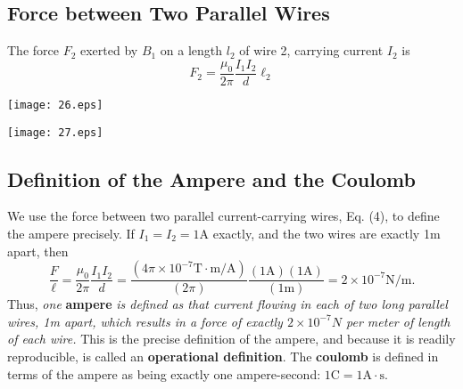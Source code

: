 \documentclass{elegantpaper}
\begin{document}
\begin{multicols}{3}
\section{Force between Two Parallel Wires}
The force $F_2$ exerted by $B_1$ on a length $l_2$ of wire 2, carrying current $I_2$ is
\begin{equation}
F _ { 2 } = \frac { \mu _ { 0 } } { 2 \pi } \frac { I _ { 1 } I _ { 2 } } { d } \ell _ { 2 }
\end{equation}
\begin{minipage}{\linewidth}
  \vspace{0.5cm}
  \setlength{\abovecaptionskip}{0.2cm}
  \setlength{\belowcaptionskip}{0.3cm}
  \centering
  \texttt{[image: 26.eps]}
  \label{fig:20-7}
\end{minipage}
\begin{minipage}{\linewidth}
  \vspace{0.5cm}
  \setlength{\abovecaptionskip}{0.2cm}
  \setlength{\belowcaptionskip}{0.3cm}
  \centering
  \texttt{[image: 27.eps]}
  \label{fig:20-7}
\end{minipage}
\subsection{Definition of the Ampere and the Coulomb}
We use the force between two parallel current-carrying wires, Eq. (4), to define the ampere precisely. If $I _ { 1 } = I _ { 2 } = 1 \mathrm { A }$ exactly, and the two wires are exactly 1m apart, then
$$
\frac { F } { \ell } = \frac { \mu _ { 0 } } { 2 \pi } \frac { I _ { 1 } I _ { 2 } } { d } = \frac { \left( 4 \pi \times 10 ^ { - 7 } \mathrm { T } \cdot \mathrm { m } / \mathrm { A } \right) } { ( 2 \pi ) } \frac { ( 1 \mathrm { A } ) ( 1 \mathrm { A } ) } { ( 1 \mathrm { m } ) } = 2 \times 10 ^ { - 7 } \mathrm { N } / \mathrm { m }.
$$
Thus, \textit{one} \textbf{ampere} \textit{is defined as that current flowing in each of two long parallel wires, 1m apart, which results in a force of exactly $2 \times 10 ^ { - 7 } N$ per meter of length of each wire.} This is the precise definition of the ampere, and because it is readily reproducible, is called an \textbf{operational definition}. The \textbf{coulomb} is defined in terms of
the ampere as being exactly one ampere-second: $1 \mathrm { C } = 1 \mathrm { A } \cdot \mathrm { s }$.


\end{multicols}
\end{document}
